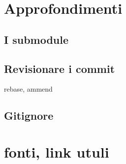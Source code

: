 \documentclass{article} \usepackage[textwidth=18cm,textheight=18cm]{geometry}
\begin{document}
\section{Approfondimenti}

\subsection{I submodule}

\subsection{Revisionare i commit}

rebase, ammend

\subsection{Gitignore}

\section{fonti, link utuli}
\end{document}
